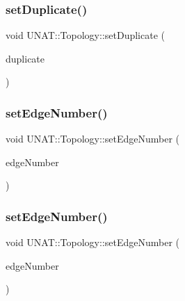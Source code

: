 \subsubsection{\texorpdfstring{setDuplicate()}{setDuplicate()}\hspace{0.1cm}{\footnotesize\ttfamily [3/3]}}
{\footnotesize\ttfamily void U\+N\+A\+T\+::\+Topology\+::set\+Duplicate (\begin{DoxyParamCaption}\item[{\mbox{\hyperlink{include_2swMacro_8h_a113cf5f6b5377cdf3fac6aa4e443e9aa}{sw\+Int}}}]{duplicate }\end{DoxyParamCaption})\hspace{0.3cm}{\ttfamily [inline]}}

\mbox{\label{classUNAT_1_1Topology_aaf9838827f3d81110b6911a23fc28864}} 
\subsubsection{\texorpdfstring{setEdgeNumber()}{setEdgeNumber()}\hspace{0.1cm}{\footnotesize\ttfamily [1/3]}}
{\footnotesize\ttfamily void U\+N\+A\+T\+::\+Topology\+::set\+Edge\+Number (\begin{DoxyParamCaption}\item[{\mbox{\hyperlink{include_2swMacro_8h_a113cf5f6b5377cdf3fac6aa4e443e9aa}{sw\+Int}}}]{edge\+Number }\end{DoxyParamCaption})\hspace{0.3cm}{\ttfamily [inline]}}

\mbox{\label{classUNAT_1_1Topology_aaf9838827f3d81110b6911a23fc28864}} 
\subsubsection{\texorpdfstring{setEdgeNumber()}{setEdgeNumber()}\hspace{0.1cm}{\footnotesize\ttfamily [2/3]}}
{\footnotesize\ttfamily void U\+N\+A\+T\+::\+Topology\+::set\+Edge\+Number (\begin{DoxyParamCaption}\item[{\mbox{\hyperlink{include_2swMacro_8h_a113cf5f6b5377cdf3fac6aa4e443e9aa}{sw\+Int}}}]{edge\+Number }\end{DoxyParamCaption})\hspace{0.3cm}{\ttfamily [inline]}}

